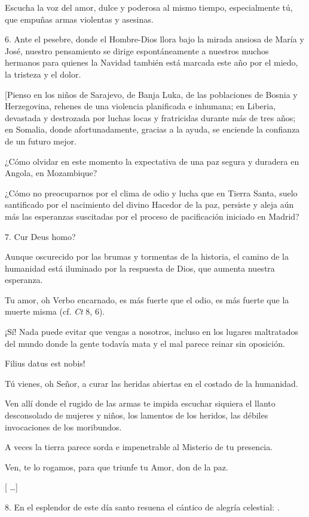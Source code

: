 \begin{body}
\begin{body}
		Escucha la voz del amor, dulce y poderosa al mismo tiempo, especialmente tú, que empuñas armas violentas y asesinas.

		6. Ante el pesebre, donde el Hombre-Dios llora bajo la mirada ansiosa de María y José, nuestro pensamiento se dirige espontáneamente a nuestros muchos hermanos para quienes la Navidad también está marcada este año por el miedo, la tristeza y el dolor.

		{[}Pienso en los niños de Sarajevo, de Banja Luka, de las poblaciones de Bosnia y Herzegovina, rehenes de una violencia planificada e inhumana; en Liberia, devastada y destrozada por luchas locas y fratricidas durante más de tres años; en Somalia, donde afortunadamente, gracias a la ayuda, se enciende la confianza de un futuro mejor.

		¿Cómo olvidar en este momento la expectativa de una paz segura y duradera en Angola, en Mozambique?

		¿Cómo no preocuparnos por el clima de odio y lucha que en Tierra Santa, suelo santificado por el nacimiento del divino Hacedor de la paz, persiste y aleja aún más las esperanzas suscitadas por el proceso de pacificación iniciado en Madrid?

		7. Cur Deus homo?

		Aunque oscurecido por las brumas y tormentas de la historia, el camino de la humanidad está iluminado por la respuesta de Dios, que aumenta nuestra esperanza.

		Tu amor, oh Verbo encarnado, es más fuerte que el odio, es más fuerte que la muerte misma (cf. \emph{Ct} 8, 6).

		¡Sí! Nada puede evitar que vengas a nosotros, incluso en los lugares maltratados del mundo donde la gente todavía mata y el mal parece reinar sin oposición.

		Filius datus est nobis!

		Tú vienes, oh Señor, a curar las heridas abiertas en el costado de la humanidad.

		Ven allí donde el rugido de las armas te impida escuchar siquiera el llanto desconsolado de mujeres y niños, los lamentos de los heridos, las débiles invocaciones de los moribundos.

		A veces la tierra parece sorda e impenetrable al Misterio de tu presencia.

		Ven, te lo rogamos, para que triunfe tu Amor, don de la paz.

		{[} \ldots{}{]}

		8. En el esplendor de este día santo resuena el cántico de alegría celestial: .


\end{body}
\end{body}
